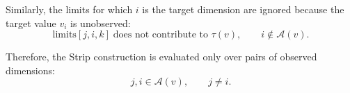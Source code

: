Similarly, the limits for which $i$ is the target dimension are ignored because the target value $v_i$ is unobserved:
\[
\text{limits}[j,i,k]\;\text{does not contribute to }\tau(v),
\qquad i\notin\mathcal{A}(v).
\]

Therefore, the Strip construction is evaluated only over pairs of observed dimensions:
\[
j,i\in\mathcal{A}(v),\qquad j\neq i.
\]











